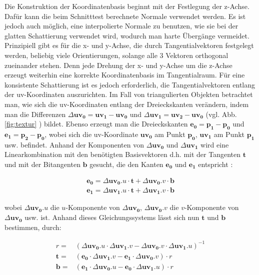 Die Konstruktion der Koordinatenbasis beginnt mit der Festlegung der z-Achse. Dafür kann die beim Schnitttest berechnete Normale verwendet werden. Es ist jedoch auch möglich, eine interpolierte Normale zu benutzen, wie sie bei der glatten Schattierung verwendet wird, wodurch man harte Übergänge vermeidet.
Prinzipiell gibt es für die x- und y-Achse, die durch Tangentialvektoren festgelegt werden, beliebig viele Orientierungen, solange alle 3 Vektoren orthogonal zueinander stehen. Denn jede Drehung der x- und y-Achse um die z-Achse erzeugt weiterhin eine korrekte Koordinatenbasis im Tangentialraum. Für eine konsistente Schattierung ist es jedoch erforderlich, die Tangentialvektoren entlang der uv-Koordinaten auszurichten. Im Fall von triangulierten Objekten betrachtet man, wie sich die uv-Koordinaten entlang der Dreieckskanten verändern, indem man die Differenzen 
\( \Delta \boldsymbol{uv_0} = \boldsymbol{uv_1} - \boldsymbol{uv_0 }\) und \( \Delta \boldsymbol{uv_1} = \boldsymbol{uv_2} - \boldsymbol{uv_0} \) (vgl. Abb.\ref{fig:textur} ) bildet. Ebenso erzeugt man die Dreieckskanten \( \boldsymbol{e_0} = \boldsymbol{p_1} - \boldsymbol{p_0} \) und \( \boldsymbol{e_1} = \boldsymbol{p_2} - \boldsymbol{p_0} \), wobei  sich die uv-Koordinate \( \boldsymbol{uv_0} \) am Punkt \( \boldsymbol{p_0} \), \( \boldsymbol{uv_1} \) am Punkt \( \boldsymbol{p_1} \) usw. befindet.
Anhand der Komponenten von \( \Delta \boldsymbol{uv_0} \) und \( \Delta \boldsymbol{uv_1} \) wird eine Linearkombination mit den benötigten Basisvektoren d.h. mit der Tangenten \( \boldsymbol{t} \) und mit der Bitangenten \( \boldsymbol{b} \) gesucht, die den Kanten \( \boldsymbol{e_0} \) und \( \boldsymbol{e_1} \) entspricht \cite{openglnormal}:

\begin{align*}
    \boldsymbol{e_0} = {\Delta \boldsymbol{uv_0}.u } \cdot \boldsymbol{t} + {\Delta \boldsymbol{uv_0}.v } \cdot \boldsymbol{b} \\
    \boldsymbol{e_1} = {\Delta \boldsymbol{uv_1}.u } \cdot \boldsymbol{t} + {\Delta \boldsymbol{uv_1}.v } \cdot \boldsymbol{b}
\end{align*}

wobei \( {\Delta \boldsymbol{uv_0}.u } \) die \( u \)-Komponente von \( \Delta \boldsymbol{uv_0} \),  \( {\Delta \boldsymbol{uv_0}.v } \) die \( v \)-Komponente von \( \Delta \boldsymbol{uv_0} \) usw. ist.
Anhand dieses Gleichungssystems lässt sich nun \( \boldsymbol{t} \) und \( \boldsymbol{b} \) bestimmen, durch:

\begin{align*}
    r =& ({\Delta \boldsymbol{uv_0}.u } \cdot {\Delta \boldsymbol{uv_1}.v } - {\Delta \boldsymbol{uv_0}.v } \cdot {\Delta \boldsymbol{uv_1}.u } )^{-1} \\
    \boldsymbol{t} =& ( \boldsymbol{e_0} \cdot {\Delta \boldsymbol{uv_1}.v } - \boldsymbol{e_1} \cdot {\Delta \boldsymbol{uv_0}.v } ) \cdot r \\
    \boldsymbol{b} =& ( \boldsymbol{e_1} \cdot {\Delta \boldsymbol{uv_0}.u } - \boldsymbol{e_0} \cdot {\Delta \boldsymbol{uv_1}.u } ) \cdot r
\end{align*}

